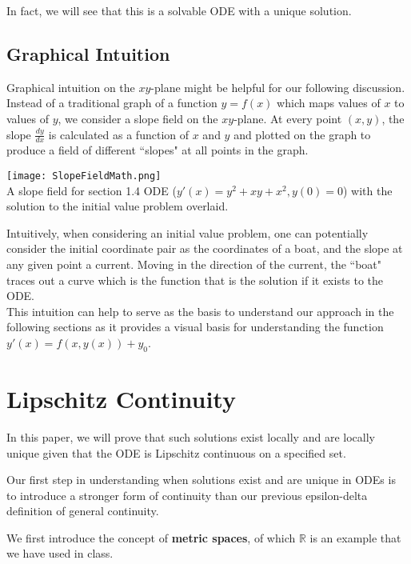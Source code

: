 \documentclass{article}
\theoremstyle{remark}
\begin{document}
In fact, we will see that this is a solvable ODE with a unique solution.


\subsection{Graphical Intuition}
Graphical intuition on the $xy$-plane might be helpful for our following discussion. Instead of a traditional graph of a function $y = f(x)$ which maps values of $x$ to values of $y$, we consider a slope field on the $xy$-plane. At every point $(x,y)$, the slope $\frac{dy}{dx}$ is calculated as a function of $x$ and $y$ and plotted on the graph to produce a field of different ``slopes" at all points in the graph. 

\begin{center}\texttt{[image: SlopeFieldMath.png]} \\ A slope field for section 1.4 ODE ($y'(x)= y^2 + xy + x^2, y(0) = 0$) with the solution to the  initial value problem overlaid. \end{center}


Intuitively, when considering an initial value problem, one can potentially consider the initial coordinate pair as the coordinates of a boat, and the slope at any given point a current. Moving in the direction of the current, the ``boat" traces out a curve which is the function that is the solution if it exists to the ODE. \\


This intuition can help to serve as the basis to understand our approach in the following sections as it provides a visual basis for understanding the function $y'(x) = f(x,y(x)) + y_0$.



\section{Lipschitz Continuity}
In this paper, we will prove that such solutions exist locally and are locally unique given that the ODE is Lipschitz continuous on a specified set.

Our first step in understanding when solutions exist and are unique in ODEs is to introduce a stronger form of continuity than our previous epsilon-delta definition of general continuity.

We first introduce the concept of \textbf{metric spaces}, of which $\mathbb{R}$ is an example that we have used in class. \\
\end{document}
